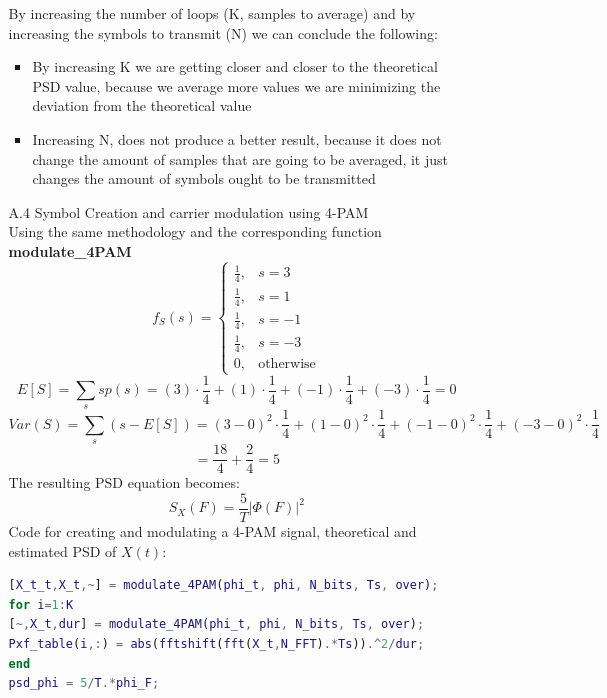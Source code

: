 \documentclass[12pt, a4paper]{article}
\begin{document}
\begin{enumerate}
\begin{enumerate}
		By increasing the number of loops (K, samples to average) and by increasing the symbols to transmit (N) we can conclude the following:\\
		\begin{itemize}
			\item By increasing K we are getting closer and closer to the theoretical PSD value, because we average more values we are minimizing the deviation from the theoretical value
			\item Increasing N, does not produce a better result, because it does not change the amount of samples that are going to be averaged, it just changes the amount of symbols ought to be transmitted 
		\end{itemize}
        \item[A.4] Symbol Creation and carrier modulation using 4-PAM\\
        Using the same methodology and the corresponding function \textbf{modulate\_4PAM}
        \[f_{S}(s) = \begin{cases} 
        	\frac{1}{4}, & s = 3 \\
        	\frac{1}{4}, & s = 1 \\
        	\frac{1}{4}, & s = -1 \\
        	\frac{1}{4}, & s = -3 \\
        	0, & \text{otherwise}
        \end{cases}
        \]
        \[E[S] = \sum_{s}sp(s) = (3)\cdot\frac{1}{4}+(1)\cdot\frac{1}{4}+(-1)\cdot\frac{1}{4}+(-3)\cdot\frac{1}{4} = 0\]
        \[Var(S) = \sum_{s}(s-E[S]) = 
        (3 - 0)^2 \cdot \frac{1}{4} + (1 - 0)^2 \cdot \frac{1}{4} + (-1 - 0)^2 \cdot \frac{1}{4} + (-3 - 0)^2 \cdot \frac{1}{4}\]
        \[ = \frac{18}{4} + \frac{2}{4}  = 5\]
        The resulting PSD equation becomes:
        \[S_X(F) = \frac{5}{T}|\Phi(F)|^2 \]
        Code for creating and modulating a 4-PAM signal, theoretical and estimated PSD of \(X(t)\):
        \begin{lstlisting}[language=MATLAB]
[X_t_t,X_t,~] = modulate_4PAM(phi_t, phi, N_bits, Ts, over);
for i=1:K
[~,X_t,dur] = modulate_4PAM(phi_t, phi, N_bits, Ts, over);
Pxf_table(i,:) = abs(fftshift(fft(X_t,N_FFT).*Ts)).^2/dur;
end
psd_phi = 5/T.*phi_F;


\end{lstlisting}
\end{enumerate}
\end{enumerate}
\end{document}
